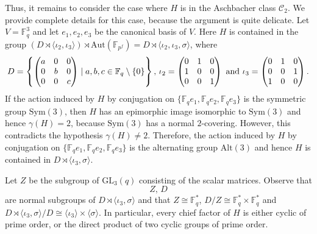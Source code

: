 \documentclass{amsart}
\begin{document}
Thus, it remains to consider the case where $H$ is in the Aschbacher class $\mathcal{C}_2$. We provide complete details for this case, because the argument is quite delicate. Let $V=\mathbb{F}_q^3$ and let $e_1,e_2,e_3$ be the canonical basis of $V$.  Here $H$ is contained in the group $(D\rtimes\langle\iota_2,\iota_3\rangle)\rtimes\mathrm{Aut}(\mathbb{F}_{p^f})=D\rtimes\langle\iota_2,\iota_3,\sigma\rangle$, where
$$D=
\left\{
\begin{pmatrix}
a&0&0\\
0&b&0\\
0&0&c
\end{pmatrix}
\mid a,b,c\in \mathbb{F}_q\setminus\{0\}
\right\},\,
\iota_2=
\begin{pmatrix}
0&1&0\\
1&0&0\\
0&0&1\\
\end{pmatrix}  \hbox{ and }
\iota_3=\begin{pmatrix}
0&1&0\\
0&0&1\\
1&0&0\\
\end{pmatrix}
.$$
If the action induced by $H$ by conjugation on $\{\mathbb{F}_qe_1,\mathbb{F}_qe_2,\mathbb{F}_qe_3\}$ is the symmetric group $\mathrm{Sym}(3)$, then $H$ has an epimorphic image isomorphic to $\mathrm{Sym}(3)$ and hence $\gamma(H)=2$, because $\mathrm{Sym}(3)$ has a normal $2$-covering. However, this contradicts the hypothesis $\gamma(H)\ne 2$. Therefore, the action induced by $H$ by conjugation on $\{\mathbb{F}_qe_1,\mathbb{F}_qe_2,\mathbb{F}_qe_3\}$ is the alternating group $\mathrm{Alt}(3)$ and hence $H$ is contained in $D\rtimes\langle\iota_3,\sigma\rangle$.

Let $Z$ be the subgroup of $\mathrm{GL}_3(q)$ consisting of the scalar matrices. Observe that $$Z,\,D$$
are normal subgroups of $D\rtimes\langle\iota_3,\sigma\rangle$ and that $Z\cong\mathbb{F}_q^\ast$, $D/Z\cong\mathbb{F}_q^\ast\times \mathbb{F}_q^\ast$ and $D\rtimes\langle\iota_3,\sigma\rangle/D\cong\langle\iota_3\rangle\times\langle\sigma\rangle$. In particular, every chief factor of $H$ is either cyclic of prime order, or the direct product of two cyclic groups of prime order.
\end{document}
